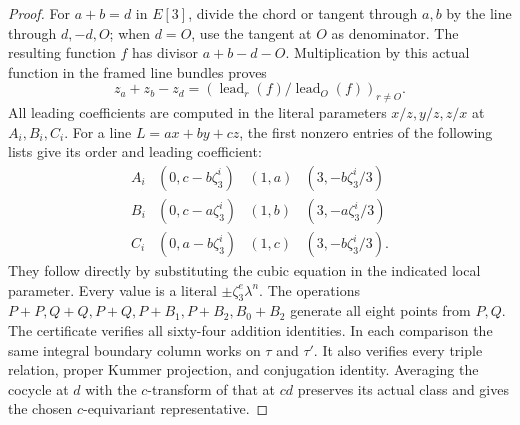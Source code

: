 \begin{proof}
For $a+b=d$ in $E[3]$, divide the chord or tangent
through $a,b$ by the line through $d,-d,O$; when
$d=O$, use the tangent at $O$ as denominator. The
resulting function $f$ has divisor $a+b-d-O$.
Multiplication by this actual function in the framed
line bundles proves
\[
       z_a+z_b-z_d=(\operatorname{lead}_r(f)/
                         \operatorname{lead}_O(f))_{r\ne O}.
 \tag{E95.27}
\]
All leading coefficients are computed in the literal
parameters $x/z,y/z,z/x$ at $A_i,B_i,C_i$. For a line
$L=ax+by+cz$, the first nonzero entries of the following
lists give its order and leading coefficient:
\[
\begin{array}{c|ccc}
A_i&(0,c-b\zeta_3^i)&(1,a)&(3,-b\zeta_3^i/3)\\
B_i&(0,c-a\zeta_3^i)&(1,b)&(3,-a\zeta_3^i/3)\\
C_i&(0,a-b\zeta_3^i)&(1,c)&(3,-b\zeta_3^i/3).
\end{array}
 \tag{E95.28}
\]
They follow directly by substituting the cubic equation
in the indicated local parameter. Every value is a
literal $\pm\zeta_3^e\lambda^n$. The operations
$P+P,Q+Q,P+Q,P+B_1,P+B_2,B_0+B_2$ generate all eight
points from $P,Q$. The certificate verifies all sixty-four
addition identities. In each comparison the same integral
boundary column works on $\tau$ and $\tau'$. It also
verifies every triple relation, proper Kummer projection,
and conjugation identity. Averaging the cocycle at $d$
with the $c$-transform of that at $cd$ preserves its actual
class and gives the chosen $c$-equivariant representative.


\end{proof}
